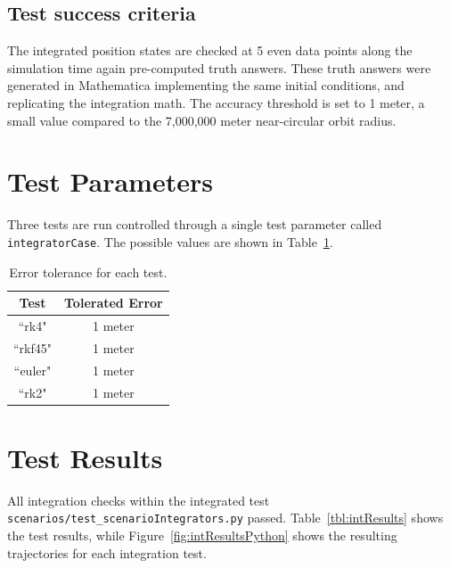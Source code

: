\subsection{Test success criteria}
The integrated position states are checked at 5 even data points along the simulation time again pre-computed truth answers.  These truth answers were generated in Mathematica implementing the same initial conditions, and replicating the integration math.    The accuracy threshold is set to 1 meter, a small value compared to the 7,000,000 meter near-circular orbit radius.



\section{Test Parameters}
Three tests are run controlled through a single test parameter called {\tt integratorCase}.  The possible values are shown in Table~\ref{tbl:intCases}.

\begin{table}[htbp]
	\caption{Error tolerance for each test.}
	\label{tbl:intCases}
	\centering \fontsize{10}{10}\selectfont
	\begin{tabular}{ c | c } %
		\hline\hline
		\textbf{Test}   	      	               & \textbf{Tolerated Error} 						           \\ \hline
		``rk4"                           & 1 meter	  \\
		``rkf45"                           & 1 meter	  \\
		``euler"                           & 1 meter	  \\
		``rk2"                           & 1 meter	  \\
		\hline\hline
	\end{tabular}
\end{table}

\section{Test Results}
All integration checks within the integrated test {\tt scenarios/test\_scenarioIntegrators.py} passed.  Table~\ref{tbl:intResults} shows the test results, while Figure~\ref{fig:intResultsPython} shows the resulting trajectories for each integration test.



